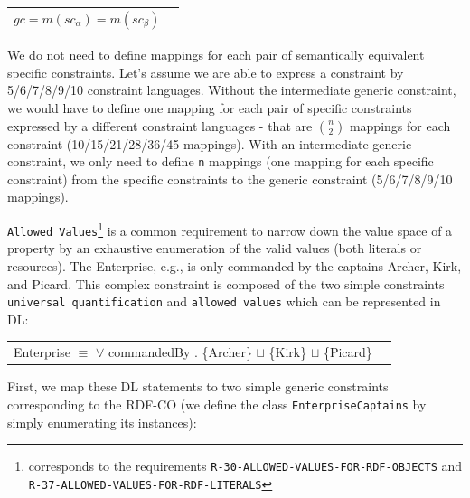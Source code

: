 \documentclass{llncs}
\newcommand{\ms}[1]{\texttt{#1}}
\newenvironment{gcotable}{
  \scriptsize
  \sffamily
  \vspace{0cm}
	\begin{center}
  \begin{tabular}{l|l|l|l|l|l|l}
  \hline
  \textbf{c. type} & \textbf{context class} & \textbf{left p. list} & \textbf{right p. list} & \textbf{classes} & \textbf{c. element} & \textbf{c. value} \\
  \hline

}{
  \hline
  \end{tabular}
	\end{center}
}
\newenvironment{DL}{
  \vspace{0cm}
	\begin{center}
  \begin{tabular}{r l}

}{
  \end{tabular}
	\end{center}
}
\begin{document}
\begin{DL}
$ gc = m(sc_{\alpha}) = m(sc_{\beta}) $
\end{DL}

We do not need to define mappings for each pair of semantically equivalent specific constraints.
Let's assume we are able to express a constraint by 5/6/7/8/9/10 constraint languages.
Without the intermediate generic constraint, we would have to define one mapping for each pair of specific constraints expressed by a different constraint languages
- that are \ms{\( {n \choose 2} \)} mappings for each constraint (10/15/21/28/36/45 mappings).
With an intermediate generic constraint, we only need to define \ms{n} mappings (one mapping for each specific constraint) from the specific constraints to the generic constraint (5/6/7/8/9/10 mappings).



\ms{Allowed Values}\footnote{corresponds to the requirements \ms{R-30-ALLOWED-VALUES-FOR-RDF-OBJECTS} and \ms{R-37-ALLOWED-VALUES-FOR-RDF-LITERALS}}
is a common requirement to narrow down the value space of a property by an exhaustive enumeration of the valid values (both literals or resources). 
The Enterprise, e.g., is only commanded by the captains Archer, Kirk, and Picard.
This complex constraint is composed of the two simple constraints \ms{universal quantification} and \ms{allowed values} which can be represented in DL:


\begin{DL}
Enterprise $\equiv$ $\forall$ commandedBy . \{Archer\} $\sqcup$ \{Kirk\} $\sqcup$ \{Picard\}
\end{DL}

First, we map these DL statements to two simple generic constraints corresponding to the RDF-CO (we define the class \ms{EnterpriseCaptains} by simply enumerating its instances):

\end{document}

